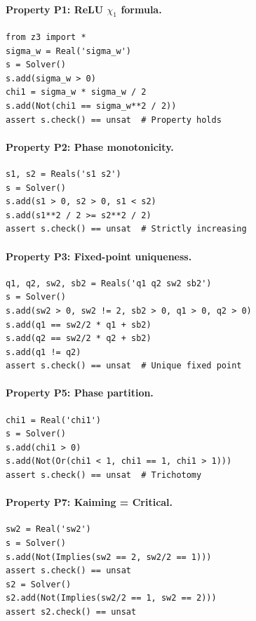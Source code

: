 \documentclass[10pt]{article}
\begin{document}
\paragraph{Property P1: ReLU $\chi_1$ formula.}
\begin{verbatim}
from z3 import *
sigma_w = Real('sigma_w')
s = Solver()
s.add(sigma_w > 0)
chi1 = sigma_w * sigma_w / 2
s.add(Not(chi1 == sigma_w**2 / 2))
assert s.check() == unsat  # Property holds
\end{verbatim}

\paragraph{Property P2: Phase monotonicity.}
\begin{verbatim}
s1, s2 = Reals('s1 s2')
s = Solver()
s.add(s1 > 0, s2 > 0, s1 < s2)
s.add(s1**2 / 2 >= s2**2 / 2)
assert s.check() == unsat  # Strictly increasing
\end{verbatim}

\paragraph{Property P3: Fixed-point uniqueness.}
\begin{verbatim}
q1, q2, sw2, sb2 = Reals('q1 q2 sw2 sb2')
s = Solver()
s.add(sw2 > 0, sw2 != 2, sb2 > 0, q1 > 0, q2 > 0)
s.add(q1 == sw2/2 * q1 + sb2)
s.add(q2 == sw2/2 * q2 + sb2)
s.add(q1 != q2)
assert s.check() == unsat  # Unique fixed point
\end{verbatim}

\paragraph{Property P5: Phase partition.}
\begin{verbatim}
chi1 = Real('chi1')
s = Solver()
s.add(chi1 > 0)
s.add(Not(Or(chi1 < 1, chi1 == 1, chi1 > 1)))
assert s.check() == unsat  # Trichotomy
\end{verbatim}

\paragraph{Property P7: Kaiming = Critical.}
\begin{verbatim}
sw2 = Real('sw2')
s = Solver()
s.add(Not(Implies(sw2 == 2, sw2/2 == 1)))
assert s.check() == unsat
s2 = Solver()
s2.add(Not(Implies(sw2/2 == 1, sw2 == 2)))
assert s2.check() == unsat
\end{verbatim}
\end{document}
